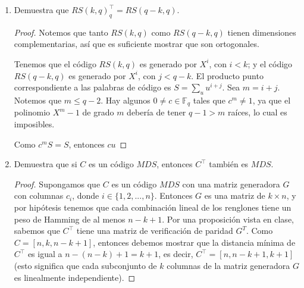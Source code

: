\documentclass[letterpaper,11pt]{article}
\begin{document}
\begin{enumerate}
\begin{proof}
        Como hay muchos conjuntos $k$ linealmente independientes que
        generan el mismo subespacio, entonces debemos dividir la expresión
        anterior entre el número de $k$ conjuntos que generan el mismo
        subespacio (i.e. el número de bases para un subespacio de dimensión 
        $k$).
        
        Así, aplicando la expresión $(4)$ al caso especial en que $n = k$, 
        tenemos que cada subespacio de dimensión $k$ de $V$ tiene
        \begin{equation}
            (q^{k}-1)(q^{k}-q)\cdots(q^{k}-q^{k-1})
        \end{equation}
        
        bases. Por lo tanto, el número de subespacios de dimensión $k$ de $V$ 
        es 
        \begin{center}
            $\mathcal{G}(n, k) = \frac{(q^{n}-1)(q^{n}-q)\cdots(q^{n}-q^{k-1})}
                                    {(q^{k}-1)(q^{k}-q)\cdots(q^{k}-q^ {k-1})}$
        \end{center}
    \end{proof}

    \item Demuestra que $RS(k, q)^{\top}_{q} = RS(q-k, q)$.
    \begin{proof}
        Notemos que tanto $RS(k,q)$ como $RS(q-k,q)$ tienen dimensiones 
        complementarias, así que es suficiente mostrar que son ortogonales.
        
        Tenemos que el código $RS(k,q)$ es generado por $X^{i}$, con $i < k$; y
        el código $RS(q-k, q)$ es generado por $X^{i}$, con $j < q-k$. El 
        producto punto correspondiente a las palabras de código es 
        $S = \sum_{u}u^{i+j}$. Sea $m = i + j$. Notemos que $m \leq q -2$.
        Hay algunos $0 \not = c \in \mathbb{F}_{q}$ tales que $c^{m} \not = 1$,
        ya que el polinomio $X^{m}-1$ de grado $m$ debería de tener $q-1 > m$
        raíces, lo cual es imposibles. 
        
        Como $c^{m}S = S$, entonces $cu$
         
    \end{proof}

    
    \item Demuestra que si $C$ es un código $MDS$, entonces $C^{\top}$ también
    es $MDS$. 
    \begin{proof}
        Supongamos que $C$ es un código $MDS$ con una matriz generadora $G$ 
        con columnas $c_{i}$, donde $i \in \{1,2, ..., n\}$. Entonces $G$ es
        una matriz de $k \times n$, y por hipótesis tenemos que cada 
        combinación lineal de los renglones tiene un peso de Hamming de al
        menos $n-k+1$. Por una proposición vista en clase, sabemos que 
        $C^{\top}$ tiene una matriz de verificación de paridad $G^{T}$.
        Como $C = [n,k,n-k+1]$, entonces debemos mostrar que la distancia
        mínima de $C^{\top}$ es igual a $n-(n-k)+1= k+1$, es decir, 
        $C^{\top} = [n,n-k+1,k+1]$ (esto significa que cada subconjunto de $k$ 
        columnas de la matriz generadora $G$ es linealmente independiente).
        

\end{proof}
\end{enumerate}
\end{document}
